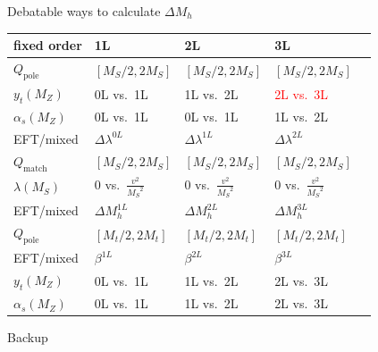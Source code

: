 \documentclass[hyperref={pdfpagelabels=false},ngerman]{beamer}
\newcommand{\MS}{\ensuremath{M_S}}
\newcommand{\pole}{\ensuremath{\text{pole}}}
\begin{document}
\begin{frame}{Debatable ways to calculate $\Delta M_h$}
  \begin{center}
  \begin{tabular}{lllll}
    \toprule
    fixed order & 1L & 2L & 3L \\
    \midrule
    $Q_\pole$ & $[\MS/2, 2\MS]$ & $[\MS/2, 2\MS]$ & $[\MS/2, 2\MS]$ \\
    $y_t(M_Z)$ & 0L vs.\ 1L & 1L vs.\ 2L & \textcolor{red}{2L vs.\ 3L} \\
    $\alpha_s(M_Z)$ & 0L vs.\ 1L & 0L vs.\ 1L & 1L vs.\ 2L \\
    \midrule
    EFT/mixed & $\Delta\lambda^{0L}$ & $\Delta\lambda^{1L}$ & $\Delta\lambda^{2L}$ \\
    \midrule
    $Q_\text{match}$ & $[\MS/2, 2\MS]$ & $[\MS/2, 2\MS]$ & $[\MS/2, 2\MS]$ \\
    $\lambda(\MS)$ & $0$ vs.\ $\frac{v^2}{\MS^2}$ & $0$ vs.\ $\frac{v^2}{\MS^2}$ & $0$ vs.\ $\frac{v^2}{\MS^2}$ \\
    \midrule
    EFT/mixed & $\Delta M_h^{1L}$ & $\Delta M_h^{2L}$ & $\Delta M_h^{3L}$ \\
    \midrule
    $Q_\pole$ & $[M_t/2, 2M_t]$ & $[M_t/2, 2M_t]$ & $[M_t/2, 2M_t]$ \\
    \midrule
    EFT/mixed & $\beta^{1L}$ & $\beta^{2L}$ & $\beta^{3L}$ \\
    \midrule
    $y_t(M_Z)$ & 0L vs.\ 1L & 1L vs.\ 2L & 2L vs.\ 3L \\
    $\alpha_s(M_Z)$ & 0L vs.\ 1L & 1L vs.\ 2L & 2L vs.\ 3L \\
    \bottomrule
  \end{tabular}
\end{center}
\end{frame}


\begin{frame}[noframenumbering]
  \begin{center}
    \Huge Backup
  \end{center}
\end{frame}
\end{document}
